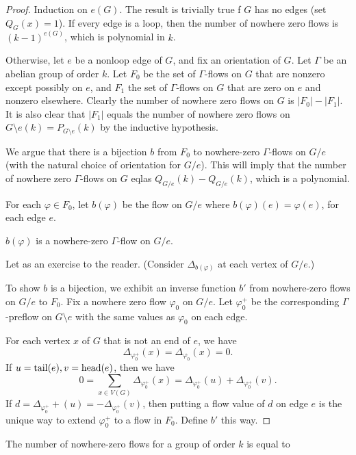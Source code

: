 \documentclass[main.tex]{subfiles}
\begin{document}
\begin{proof}
  Induction on $e(G)$.
  The result is trivially true f $G$ has no edges (set $Q_G(x) = 1$).
  If every edge is a loop, then the number of nowhere zero flows is
  $(k-1)^{e(G)}$, which is polynomial in $k$.

  Otherwise, let $e$ be a nonloop edge of $G$, and fix an orientation of $G$.
  Let $\Gamma$ be an abelian group of order $k$.
  Let $F_0$ be the set of $\Gamma$-flows on $G$ that are nonzero except possibly on $e$,
  and $F_1$ the set of $\Gamma$-flows on $G$ that are zero on $e$ and nonzero
  elsewhere.
  Clearly the number of nowhere zero flows on $G$ is $|F_0| - |F_1|$.
  It is also clear that $|F_1|$ equals the number of nowhere zero flows on
  $G\setminus e(k) = P_{G\setminus e}(k)$ by the inductive hypothesis.

  We argue that there is a bijection $b$ from $F_0$ to nowhere-zero
  $\Gamma$-flows on $G/e$ (with the natural choice of orientation for $G/e$).
  This will imply that the number of nowhere zero $\Gamma$-flows on $G$ eqlas
  $Q_{G/e}(k) - Q_{G/e}(k)$, which is a polynomial.

  For each $\varphi\in F_0$, let $b(\varphi)$ be the flow on $G/e$ where
  $b(\varphi)(e) = \varphi(e)$, for each edge $e$.
  \begin{claim}
    $b(\varphi)$ is a nowhere-zero $\Gamma$-flow on $G/e$.
  \end{claim}
  \begin{subproof}
    Let as an exercise to the reader.
    (Consider $\Delta_{b(\varphi)}$ at each vertex of $G/e$.)
  \end{subproof}
  To show $b$ is a bijection, we exhibit an inverse function $b'$ from
  nowhere-zero flows on $G/e$ to $F_0$.
  Fix a nowhere zero flow $\varphi_0$ on $G/e$.
  Let $\varphi_0^+$ be the corresponding $\Gamma$-preflow on $G\setminus e$
  with the same values as $\varphi_0$ on each edge.

  For each vertex $x$ of $G$ that is not an end of $e$, we have
  \[
    \Delta_{\varphi_0^+}(x) = \Delta_{\varphi_0}(x) = 0.
  \]
  If $u = \operatorname{tail}(e), v = \operatorname{head}(e)$, then we have
  \[
    0 = \sum_{x\in V(G)}\Delta_{\varphi_0^+}(x)
    = \Delta_{\varphi_0^+}(u) + \Delta_{\varphi_0^+}(v).
  \]
  If $d = \Delta_{\varphi_0^+}+(u) = -\Delta_{\varphi_0^+}(v)$, then putting a
  flow value of $d$ on edge $e$ is the unique way to extend $\varphi_0^+$ to a
  flow in $F_0$.
  Define $b'$ this way.
\end{proof}
The number of nowhere-zero flows for a group of order $k$ is equal to
\end{document}
